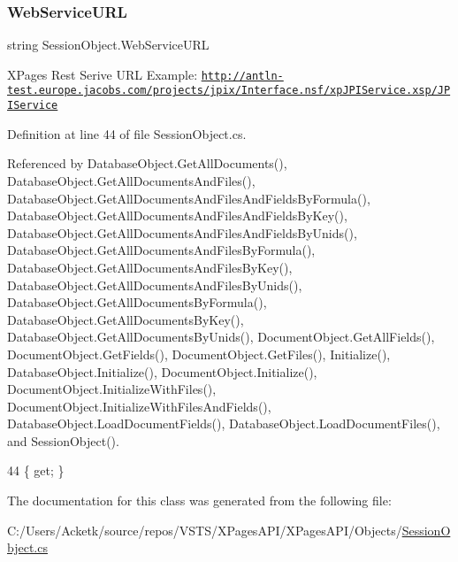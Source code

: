 \subsubsection{\texorpdfstring{Web\+Service\+U\+RL}{WebServiceURL}}
{\footnotesize\ttfamily string Session\+Object.\+Web\+Service\+U\+RL\hspace{0.3cm}{\ttfamily [get]}}



X\+Pages Rest Serive U\+RL Example\+: \href{http://antln-test.europe.jacobs.com/projects/jpix/Interface.nsf/xpJPIService.xsp/JPIService}{\tt http\+://antln-\/test.\+europe.\+jacobs.\+com/projects/jpix/\+Interface.\+nsf/xp\+J\+P\+I\+Service.\+xsp/\+J\+P\+I\+Service} 



Definition at line 44 of file Session\+Object.\+cs.



Referenced by Database\+Object.\+Get\+All\+Documents(), Database\+Object.\+Get\+All\+Documents\+And\+Files(), Database\+Object.\+Get\+All\+Documents\+And\+Files\+And\+Fields\+By\+Formula(), Database\+Object.\+Get\+All\+Documents\+And\+Files\+And\+Fields\+By\+Key(), Database\+Object.\+Get\+All\+Documents\+And\+Files\+And\+Fields\+By\+Unids(), Database\+Object.\+Get\+All\+Documents\+And\+Files\+By\+Formula(), Database\+Object.\+Get\+All\+Documents\+And\+Files\+By\+Key(), Database\+Object.\+Get\+All\+Documents\+And\+Files\+By\+Unids(), Database\+Object.\+Get\+All\+Documents\+By\+Formula(), Database\+Object.\+Get\+All\+Documents\+By\+Key(), Database\+Object.\+Get\+All\+Documents\+By\+Unids(), Document\+Object.\+Get\+All\+Fields(), Document\+Object.\+Get\+Fields(), Document\+Object.\+Get\+Files(), Initialize(), Database\+Object.\+Initialize(), Document\+Object.\+Initialize(), Document\+Object.\+Initialize\+With\+Files(), Document\+Object.\+Initialize\+With\+Files\+And\+Fields(), Database\+Object.\+Load\+Document\+Fields(), Database\+Object.\+Load\+Document\+Files(), and Session\+Object().


\begin{DoxyCode}
44 \{ \textcolor{keyword}{get}; \}
\end{DoxyCode}


The documentation for this class was generated from the following file\+:\begin{DoxyCompactItemize}
\item 
C\+:/\+Users/\+Acketk/source/repos/\+V\+S\+T\+S/\+X\+Pages\+A\+P\+I/\+X\+Pages\+A\+P\+I/\+Objects/\mbox{\hyperlink{_session_object_8cs}{Session\+Object.\+cs}}\end{DoxyCompactItemize}
